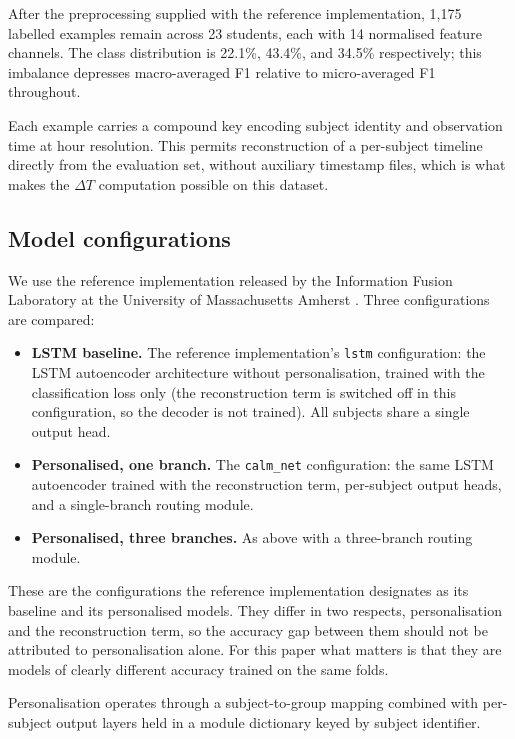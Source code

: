 \documentclass[preprint,12pt,authoryear]{elsarticle}
\newcommand{\dt}{$\Delta T$}
\begin{document}
After the preprocessing supplied with the reference implementation,
1{,}175 labelled examples remain across 23 students, each with 14
normalised feature channels. The class distribution is 22.1\%,
43.4\%, and 34.5\% respectively; this imbalance depresses
macro-averaged F1 relative to micro-averaged F1 throughout.

Each example carries a compound key encoding subject identity and
observation time at hour resolution. This permits reconstruction of a
per-subject timeline directly from the evaluation set, without auxiliary
timestamp files, which is what makes the \dt{} computation possible on
this dataset.

\subsection{Model configurations}

We use the reference implementation released by the Information Fusion
Laboratory at the University of Massachusetts Amherst \citep{iflrepo}.
Three configurations are compared:

\begin{itemize}
\item \textbf{LSTM baseline.} The reference implementation's
\texttt{lstm} configuration: the LSTM autoencoder architecture without
personalisation, trained with the classification loss only (the
reconstruction term is switched off in this configuration, so the
decoder is not trained). All subjects share a single output head.
\item \textbf{Personalised, one branch.} The \texttt{calm\_net}
configuration: the same LSTM autoencoder trained with the
reconstruction term, per-subject output heads, and a single-branch
routing module.
\item \textbf{Personalised, three branches.} As above with a
three-branch routing module.
\end{itemize}

These are the configurations the reference implementation designates as
its baseline and its personalised models. They differ in two respects,
personalisation and the reconstruction term, so the accuracy gap
between them should not be attributed to personalisation alone. For
this paper what matters is that they are models of clearly different
accuracy trained on the same folds.

Personalisation operates through a subject-to-group mapping combined
with per-subject output layers held in a module dictionary keyed by
subject identifier.
\end{document}
